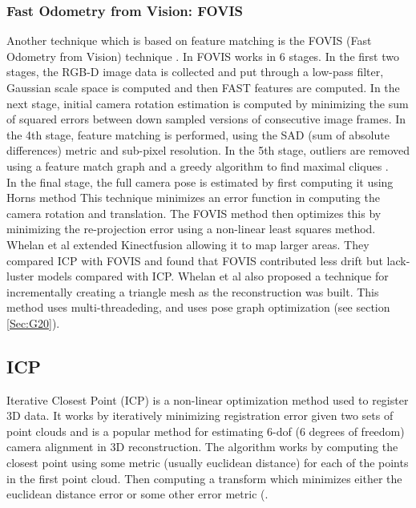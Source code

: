 \subsubsection{Fast Odometry from Vision: FOVIS}

Another technique which is based on feature matching is the FOVIS (Fast Odometry from Vision) technique \cite{Huang17Visual}. In FOVIS works in 6 stages. In the first two stages, the RGB-D image data is collected and put through a low-pass filter, Gaussian scale space is computed and then FAST features \cite{Rosten06Machine,Rosten05Fusing} are computed. In the next stage, initial camera rotation estimation is computed by minimizing the sum of squared errors between down sampled versions of consecutive image frames. In the 4th stage, feature matching is performed, using the SAD (sum of absolute differences) metric and sub-pixel resolution. In the 5th stage, outliers are removed using a feature match graph and a greedy algorithm to find maximal cliques \cite{Hirschmuller02Fast,Howard08Real}. \\

In the final stage, the full camera pose is estimated by first computing it using Horns method \cite{Horn87Closed} This technique minimizes an error function in computing the camera rotation and translation. The FOVIS method then optimizes this by minimizing the re-projection error using a non-linear least squares method. \\

Whelan et al \cite{Whelan12Kintinuous} extended Kinectfusion allowing it to map larger areas. They compared ICP with FOVIS and found that FOVIS contributed less drift but lack-luster models compared with ICP. Whelan et al also proposed a technique for incrementally creating a triangle mesh as the reconstruction was built. This method uses multi-threadeding, and uses pose graph optimization (see section \ref{Sec:G20}).



\subsection{ICP}

\label{ICPSection}

Iterative Closest Point (ICP) \cite{Besl92Method,Rusinkiewicz01Efficient,Segal09Generalized} is a non-linear optimization method used to register 3D data. It works by iteratively minimizing registration error given two sets of point clouds and is a popular method for estimating 6-dof (6 degrees of freedom) camera alignment in 3D reconstruction. The algorithm works by computing the closest point using some metric (usually euclidean distance) for each of the points in the first point cloud. Then computing a transform which minimizes either the euclidean distance error or some other error metric (\cite{Steinbrucker11Real,Tykkala11Direct,Kerl13Robust,Chen92Object,Stuckler12Robust}. \\

